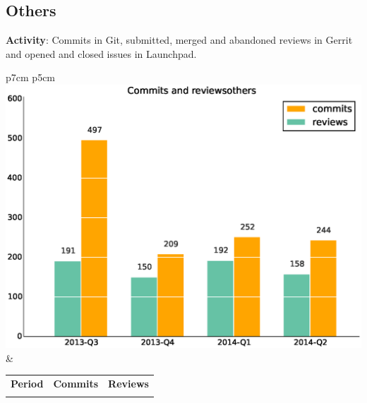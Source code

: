 \documentclass[a4wide,11pt]{report}
\begin{document}
\newpage
\subsection{Others}

\textbf{Activity}: Commits in Git, submitted, merged and abandoned reviews in Gerrit and opened and closed issues in Launchpad.

\begin{tabular}{p{7cm} p{5cm}}
    \vspace{0pt} 
    \includegraphics[scale=.35]{figs/commitsothers.eps}
    & 
    \vspace{0pt}
    \begin{tabular}{l|r|r|}%
    \bfseries Period & \bfseries Commits & \bfseries Reviews %
    \csvreader[head to column names]{data/commitsothers.csv}{}%
    {\\ & \commits & \submitted}
    \end{tabular}
\end{tabular}
\end{document}
